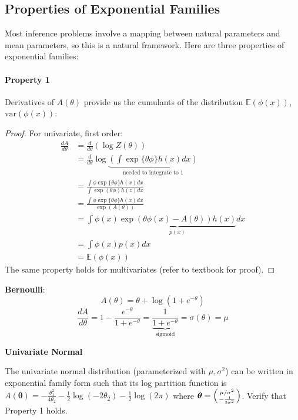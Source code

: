 \documentclass{article}
\begin{document}
\subsection{Properties of Exponential Families}
Most inference problems involve a mapping between natural parameters and mean parameters, so this is a natural framework. Here are three properties of exponential families:

\paragraph{Property 1} Derivatives of $A(\theta)$ provide us the cumulants of the distribution $\mathbb{E}(\phi(x))$, $\text{var}(\phi(x))$:
\begin{proof}
For univariate, first order:
\begin{align*}
\frac{d A}{d \theta} &= \frac{d}{d\theta}(\log Z(\theta)) \\
&= \frac{d}{d \theta} \log \underbrace{\left(\int \exp\{\theta \phi\} h(x) dx\right)}_{\text{needed to integrate to $1$}} \\
&= \frac{\int\phi \exp\{\theta\phi\}h(x) dx}{\int \exp( \theta \phi) h(z) dx}\\
&= \frac{\int\phi \exp\{\theta\phi\}h(x) dx}{\exp(A(\theta))} \\
&= \int \phi(x) \underbrace{\exp(\theta \phi(x) - A(\theta)) h(x)}_{p(x)} dx\\
&= \int \phi(x) p(x) dx \\
&= \mathbb{E}(\phi(x))
\end{align*}
The same property holds for multivariates (refer to textbook for proof). 
\end{proof}

\textbf{Bernoulli}: 
\[A(\theta) = \theta + \log(1 + e^{-\theta})\]
\[\frac{d A}{d\theta} = 1 - \frac{e^{-\theta}}{1 + e^{-\theta}} = \underbrace{\frac{1}{1 + e^{-\theta}}}_{\text{sigmoid}} = \sigma(\theta) = \mu \]

\textbf{Univariate Normal}
\begin{exercise}
The univariate normal distribution (parameterized with $\mu, \sigma^{2}$) can be written in exponential family form such that its log partition function is $A(\bm{\theta}) = -\frac{\theta_{1}^{2}}{4\theta_{2}} - \frac{1}{2}\log(-2\theta_{2}) - \frac{1}{2}\log(2\pi)$ where $\bm{\theta} = \left(\mu/\sigma^{2} \atop -\frac{1}{2\sigma^{2}}\right)$. Verify that Property 1 holds.
\end{exercise}
\end{document}
